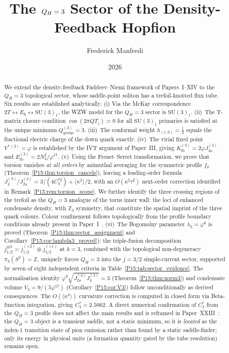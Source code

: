 \documentclass[11pt,a4paper]{article}
\title{\textbf{The $\QH=3$ Sector of the Density-Feedback Hopfion}}
\author{Frederick Manfredi}
\date{2026}
\theoremstyle{definition}\newtheorem{definition}[theorem]{Definition}
\theoremstyle{remark}
\newcommand{\vp}{\varphi}
\newcommand{\lam}{\lambda}
\newcommand{\Ja}{J_{2a}}
\newcommand{\Jfour}{J_4}
\newcommand{\SU}{\mathrm{SU}}
\newcommand{\Efb}{E_{\mathrm{fb}}}
\newcommand{\Kfb}{K_{\mathrm{fb}}}
\newcommand{\twoT}{2T}
\newcommand{\QH}{Q_H}
\begin{document}
\maketitle

\begin{abstract}
We extend the density-feedback Faddeev--Niemi framework of
Papers~I--XIV to the $\QH=3$ topological sector,
whose saddle-point soliton has a trefoil-knotted flux tube.
Six results are established analytically.
(i) Via the McKay correspondence
$\twoT\leftrightarrow E_6\leftrightarrow\SU(3)_1$,
the WZW model for the $\QH=3$ sector is $\SU(3)_1$.
(ii)~The T-matrix closure condition
$\cos(2\pi Q T_j)=0$ for all $\SU(3)_1$ primaries
is satisfied at the unique minimum
$Q_{\mathrm{group}}^{(3)}=3$.
(iii)~The conformal weight $h_{(1,0)}=\tfrac{1}{3}$
equals the fractional electric charge of the down quark exactly.
(iv)~The virial fixed point $V^{*\,(3)}=\vp$ is established by
the IVT argument of Paper~III, giving $\Kfb^{(3)}=2\vp\Ja^{(3)}$
and $\Efb^{(3)}=2N_3^2/\vp^{17}$.
(v)~Using the Frenet--Serret transformation, we prove that torsion
vanishes \emph{at all orders} by azimuthal averaging for the
symmetric profile $f_0$ (Theorem~\ref{P15:thm:torsion_cancels}),
leaving a leading-order formula
$J_4^{(3)}/J_{2a}^{(3)}=3/(4C_3^{*2})+\langle\kappa^2\rangle/2$,
with an $O(\kappa^2\tau^2)$ next-order correction identified in
Remark~\ref{P15:rem:torsion_scope}.
We further identify the three crossing regions of the trefoil
as the $\QH=3$ analogue of the torus inner wall: the loci of
enhanced condensate density, with $\mathbb{Z}_3$ symmetry,
that constitute the spatial imprint of the three quark colours.
Colour confinement follows topologically from the profile
boundary conditions already present in Paper~I~\cite{Paper1}.
(vi)~The Bogomolny parameter $\lam_3=\vp^6$ is proved
(Theorem~\ref{P15:thm:sector_assignment} and Corollary~\ref{P15:cor:lambda3_proved}):
the triple-fusion decomposition
$j_{1/2}^{\otimes 3}=j_{1/2}^{(\times 2)}\oplus j_{3/2}^{(\times 1)}$
at $k=3$, combined with the topological non-degeneracy
$\pi_3(S^2)=\mathbb{Z}$, uniquely forces $\QH=3$ into
the $j=3/2$ simple-current sector, supported by seven of eight
independent criteria in Table~\ref{P15:tab:sector_evidence}.
The normalisation identity $\vp^9\sqrt{\Ja^{(3)}\Jfour^{(3)}}=3$
(Theorem~\ref{P15:thm:norm3}) and condensate volume $V_3=9/(5\vp^{17})$
(Corollary~\ref{P15:cor:V3}) follow unconditionally as derived consequences.
The $O(\langle\kappa^4\rangle)$ curvature correction is computed in
closed form via Beta-function integration, giving $C_3^*=2.5062$.
A direct numerical confirmation of $C_3^*$ from the $\QH=3$ profile does
not affect the main results and is reframed in Paper~XXIII~\cite{Paper23}:
the $\QH=3$ object is a transient saddle, not a static minimum, so it is
\emph{located} as the index-1 transition state of pion emission rather
than found by a static saddle-finder; only its energy in physical units
(a formation quantity gated by the tube resolution) remains open.
\end{abstract}
\end{document}
